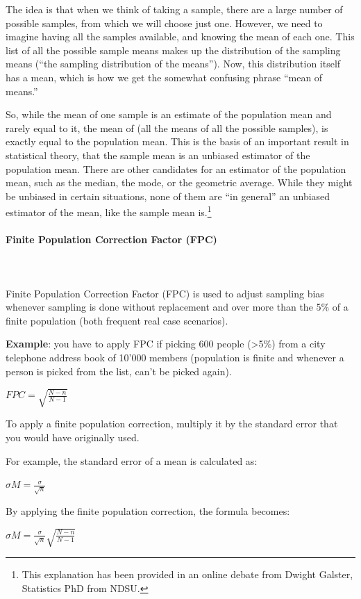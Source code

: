 \documentclass{article}
\begin{document}
The idea is that when we think of taking a sample, there are a large number of possible samples, from which we will choose just one. However, we need to imagine having all the samples available, and knowing the mean of each one. This list of all the possible sample means makes up the distribution of the sampling means (“the sampling distribution of the means”). Now, this distribution itself has a mean, which is how we get the somewhat confusing phrase “mean of means.”

So, while the mean of one sample is an estimate of the population mean and rarely equal to it, the mean of (all the means of all the possible samples), is exactly equal to the population mean. This is the basis of an important result in statistical theory, that the sample mean is an unbiased estimator of the population mean. There are other candidates for an estimator of the population mean, such as the median, the mode, or the geometric average. While they might be unbiased in certain situations, none of them are “in general” an unbiased estimator of the mean, like the sample mean is.\footnote{This explanation has been provided in an online debate from Dwight Galster, Statistics PhD from NDSU.}

\paragraph{Finite Population Correction Factor (FPC)}\mbox{} \\
\mbox{} \\
Finite Population Correction Factor (FPC) is used to adjust sampling bias whenever sampling is done without replacement and over more than the 5\% of a finite population (both frequent real case scenarios).

\textbf{Example}: you have to apply FPC if picking 600 people (>5\%) from a city telephone address book of 10’000 members (population is finite and whenever a person is picked from the list, can’t be picked again).

$FPC = \sqrt{\frac{N -n}{N - 1}}$

To apply a finite population correction, multiply it by the standard error that you would have originally used.

For example, the standard error of a mean is calculated as:

$\sigma{M} = \frac{\sigma}{\sqrt{n}}$

By applying the finite population correction, the formula becomes:

$\sigma{M} = \frac{\sigma}{\sqrt{n}}\sqrt{\frac{N -n}{N - 1}}$
\end{document}
